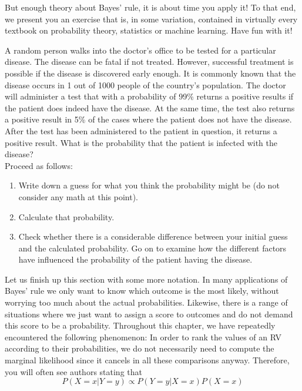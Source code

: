 But enough theory about Bayes' rule, it is about time you apply it! To that end, we present you an exercise that is, in some variation,
contained in virtually every textbook on probability theory, statistics or machine learning. Have fun with it!

\begin{Exercise}
A random person walks into the doctor's office to be tested for a particular disease. The disease can be fatal if not treated. However,
successful treatment is possible if the disease is discovered early enough. It is commonly known that the disease occurs in 1 out
of 1000 people of the country's population. The doctor will administer a test that with a probability of 99\% returns a positive results
if the patient does indeed have the disease. At the same time, the test also returns a positive result in 5\% of the cases where the
patient does not have the disease. After the test has been administered to the patient in question, it returns a positive result.
What is the probability that the patient is infected with the disease? 
\\
Proceed as follows:
\begin{enumerate}
\item Write down a guess for what you think the probability might be (do not consider any math at this point).
\item Calculate that probability.
\item Check whether there is a considerable difference between your initial guess and the calculated probability. Go on to examine
how the different factors have influenced the probability of the patient having the disease.
\end{enumerate}
\end{Exercise}

Let us finish up this section with some more notation. In many applications of Bayes' rule we only want to know which outcome is
the most likely, without worrying too much about the actual probabilities. Likewise, there is a range of situations where we
just want to assign a score to outcomes and do not demand this score to be a probability. Throughout this chapter,
we have repeatedly encountered the following phenomenon: In order to rank the values of an RV according to their probabilities, we do not necessarily need to compute the marginal likelihood since it cancels in all these comparisons anyway. Therefore, you will often see authors stating that
\begin{equation} \label{proportionality}
P(X=x|Y=y) \propto P(Y=y|X=x)P(X=x)
\end{equation}

